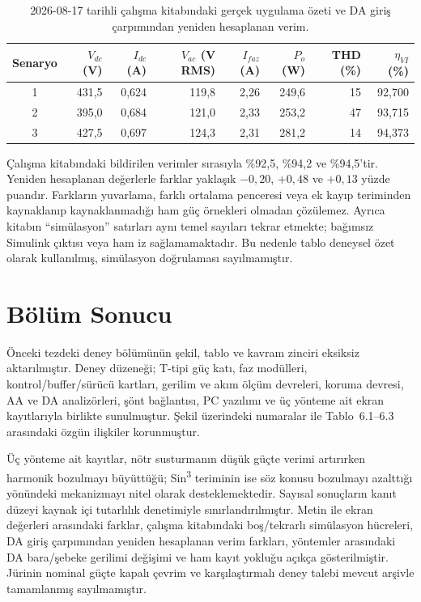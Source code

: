 \begin{table}[htbp]
  \centering
  \caption{2026-08-17 tarihli çalışma kitabındaki gerçek uygulama özeti ve DA giriş çarpımından yeniden hesaplanan verim.}
  \label{tab:gelen-excel-senaryolar}
  \footnotesize
  \begin{tabularx}{\textwidth}{c r r r r r r r}
    \toprule
    Senaryo & $V_{dc}$ (V) & $I_{dc}$ (A) & $V_{ac}$ (V RMS) & $I_{faz}$ (A) & $P_o$ (W) & THD (\%) & $\eta_{VI}$ (\%) \\
    \midrule
    1 & 431,5 & 0,624 & 119,8 & 2,26 & 249,6 & 15 & 92,700 \\
    2 & 395,0 & 0,684 & 121,0 & 2,33 & 253,2 & 47 & 93,715 \\
    3 & 427,5 & 0,697 & 124,3 & 2,31 & 281,2 & 14 & 94,373 \\
    \bottomrule
  \end{tabularx}
\end{table}

Çalışma kitabındaki bildirilen verimler sırasıyla \%92,5, \%94,2 ve \%94,5'tir. Yeniden hesaplanan değerlerle farklar yaklaşık $-0{,}20$, $+0{,}48$ ve $+0{,}13$ yüzde puandır. Farkların yuvarlama, farklı ortalama penceresi veya ek kayıp teriminden kaynaklanıp kaynaklanmadığı ham güç örnekleri olmadan çözülemez. Ayrıca kitabın ``simülasyon'' satırları aynı temel sayıları tekrar etmekte; bağımsız Simulink çıktısı veya ham iz sağlamamaktadır. Bu nedenle tablo deneysel özet olarak kullanılmış, simülasyon doğrulaması sayılmamıştır.

\section{Bölüm Sonucu}

Önceki tezdeki deney bölümünün şekil, tablo ve kavram zinciri eksiksiz aktarılmıştır. Deney düzeneği; T-tipi güç katı, faz modülleri, kontrol/buffer/sürücü kartları, gerilim ve akım ölçüm devreleri, koruma devresi, AA ve DA analizörleri, şönt bağlantısı, PC yazılımı ve üç yönteme ait ekran kayıtlarıyla birlikte sunulmuştur. Şekil üzerindeki numaralar ile Tablo~6.1--6.3 arasındaki özgün ilişkiler korunmuştur.

Üç yönteme ait kayıtlar, nötr susturmanın düşük güçte verimi artırırken harmonik bozulmayı büyüttüğü; Sin\textsuperscript{3} teriminin ise söz konusu bozulmayı azalttığı yönündeki mekanizmayı nitel olarak desteklemektedir. Sayısal sonuçların kanıt düzeyi kaynak içi tutarlılık denetimiyle sınırlandırılmıştır. Metin ile ekran değerleri arasındaki farklar, çalışma kitabındaki boş/tekrarlı simülasyon hücreleri, DA giriş çarpımından yeniden hesaplanan verim farkları, yöntemler arasındaki DA bara/şebeke gerilimi değişimi ve ham kayıt yokluğu açıkça gösterilmiştir. Jürinin nominal güçte kapalı çevrim ve karşılaştırmalı deney talebi mevcut arşivle tamamlanmış sayılmamıştır.
